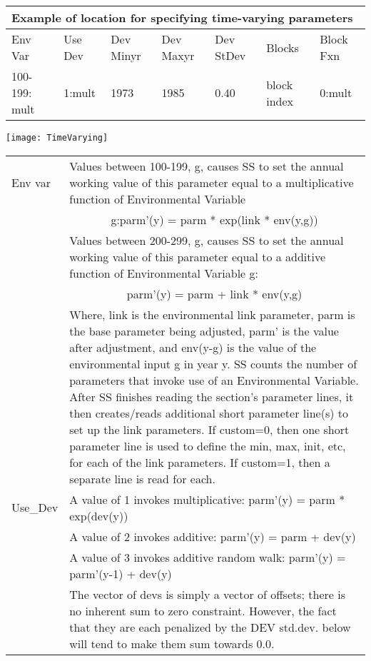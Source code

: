 \begin{center}
	\begin{longtable}{p{2cm} p{2cm} p{2cm} p{2cm} p{2cm} p{2.25cm} p{1.75cm}}
		\multicolumn{7}{l}{Example of location for specifying time-varying parameters}\\
		\hline
		Env Var & Use Dev & Dev Minyr & Dev Maxyr & Dev StDev & Blocks & Block Fxn\\
		\hline
		100-199: mult & 1:mult & 1973 & 1985 & 0.40 & block index & 0:mult\\
		\hline
	\end{longtable}
\end{center}
\begin{center}
	\texttt{[image: TimeVarying]}
\end{center}
\begin{center}
	\begin{longtable}{p{2.5cm} p{13cm}}
		\hline
		Env var & Values between 100-199, g, causes SS to set the annual working value of this parameter equal to a multiplicative function of Environmental Variable\\
		    & \multicolumn{1}{c}{g:parm’(y) = parm * exp(link * env(y,g))} \\
			& Values between 200-299, g, causes SS to set the annual working value of this parameter equal to a additive function of Environmental Variable g:\\
		    & \multicolumn{1}{c}{parm’(y) = parm + link * env(y,g)}\\
			& Where, link is the environmental link parameter, parm is the base parameter being adjusted, parm’ is the value after adjustment, and env(y-g) is the value of the environmental input g in year y. SS counts the number of parameters that invoke use of an Environmental Variable.  After SS finishes reading the section’s parameter lines, it then creates/reads additional short parameter line(s) to set up the link parameters.  If custom=0, then one short parameter line is used to define the min, max, init, etc, for each of the link parameters.  If custom=1, then a separate line is read for each.\\
		\hline
		Use\_Dev & A value of 1 invokes multiplicative:  parm’(y) = parm * exp(dev(y))\\
			& A value of 2 invokes additive:  parm’(y) = parm + dev(y)\\
			& A value of 3 invokes additive random walk:  parm’(y) = parm’(y-1) + dev(y)\\
		    & The vector of devs is simply a vector of offsets; there is no inherent sum to zero constraint.  However, the fact that they are each penalized by the DEV std.dev. below will tend to make them sum towards 0.0.\\

\end{longtable}
\end{center}

